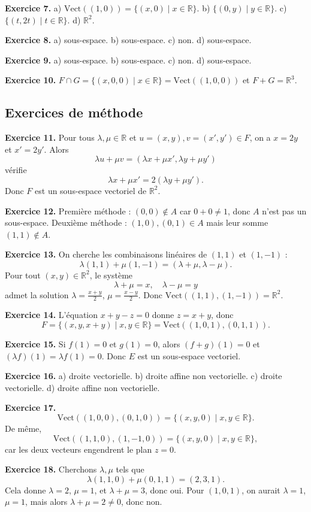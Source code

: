 \documentclass[11pt,a4paper]{article}
\newcommand{\R}{\mathbb R}
\newcommand{\Vect}{\mathrm{Vect}}
\begin{document}
\textbf{Exercice 7.} a) $\Vect((1,0))=\{(x,0)\mid x\in\R\}$. b) $\{(0,y)\mid y\in\R\}$. c) $\{(t,2t)\mid t\in\R\}$. d) $\R^2$.

\textbf{Exercice 8.} a) sous-espace. b) sous-espace. c) non. d) sous-espace.

\textbf{Exercice 9.} a) sous-espace. b) sous-espace. c) non. d) sous-espace.

\textbf{Exercice 10.} $F\cap G=\{(x,0,0)\mid x\in\R\}=\Vect((1,0,0))$ et $F+G=\R^3$.

\subsection*{Exercices de méthode}
\textbf{Exercice 11.} Pour tous $\lambda,\mu\in\R$ et $u=(x, y), v=(x',y')\in F$, on a $x=2y$ et $x'=2y'$. Alors
\[\lambda u+\mu v=(\lambda x+\mu x',\lambda y+\mu y')\]
vérifie
\[\lambda x+\mu x'=2(\lambda y+\mu y').\]
Donc $F$ est un sous-espace vectoriel de $\R^2$.

\textbf{Exercice 12.} Première méthode : $(0,0)\notin A$ car $0+0\neq 1$, donc $A$ n'est pas un sous-espace. Deuxième méthode : $(1,0),(0,1)\in A$ mais leur somme $(1,1)\notin A$.

\textbf{Exercice 13.} On cherche les combinaisons linéaires de $(1,1)$ et $(1,-1)$ :
\[\lambda(1,1)+\mu(1,-1)=(\lambda+\mu,\lambda-\mu).\]
Pour tout $(x,y)\in\R^2$, le système
\[\lambda+\mu=x,\quad \lambda-\mu=y\]
admet la solution $\lambda=\frac{x+y}{2}$, $\mu=\frac{x-y}{2}$. Donc $\Vect((1,1),(1,-1))=\R^2$.

\textbf{Exercice 14.} L'équation $x+y-z=0$ donne $z=x+y$, donc
\[F=\{(x,y,x+y)\mid x,y\in\R\}=\Vect((1,0,1),(0,1,1)).\]

\textbf{Exercice 15.} Si $f(1)=0$ et $g(1)=0$, alors $(f+g)(1)=0$ et $(\lambda f)(1)=\lambda f(1)=0$. Donc $E$ est un sous-espace vectoriel.

\textbf{Exercice 16.} a) droite vectorielle. b) droite affine non vectorielle. c) droite vectorielle. d) droite affine non vectorielle.

\textbf{Exercice 17.} 
\[\Vect((1,0,0),(0,1,0))=\{(x,y,0)\mid x,y\in\R\}.\]
De même,
\[\Vect((1,1,0),(1,-1,0))=\{(x,y,0)\mid x,y\in\R\},\]
car les deux vecteurs engendrent le plan $z=0$.

\textbf{Exercice 18.} Cherchons $\lambda,\mu$ tels que
\[\lambda(1,1,0)+\mu(0,1,1)=(2,3,1).\]
Cela donne $\lambda=2$, $\mu=1$, et $\lambda+\mu=3$, donc oui. Pour $(1,0,1)$, on aurait $\lambda=1$, $\mu=1$, mais alors $\lambda+\mu=2\neq 0$, donc non.
\end{document}
